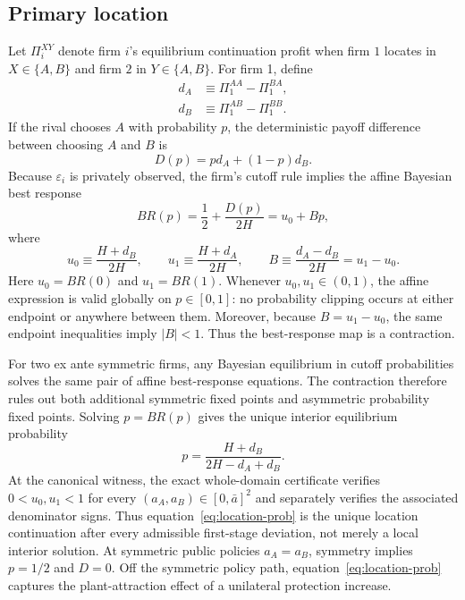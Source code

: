 \subsection{Primary location}

Let $\Pi^{XY}_i$ denote firm $i$'s equilibrium continuation profit when firm $1$ locates in $X\in\{A,B\}$ and firm $2$ in $Y\in\{A,B\}$. For firm 1, define
\begin{align}
d_A&\equiv \Pi^{AA}_1-\Pi^{BA}_1,\\
d_B&\equiv \Pi^{AB}_1-\Pi^{BB}_1.
\end{align}
If the rival chooses $A$ with probability $p$, the deterministic payoff difference between choosing $A$ and $B$ is
\begin{equation}
D(p)=p d_A+(1-p)d_B.
\end{equation}
Because $\varepsilon_i$ is privately observed, the firm's cutoff rule implies the affine Bayesian best response
\begin{equation}
BR(p)=\frac12+\frac{D(p)}{2H}
=u_0+Bp,
\label{eq:location-br}
\end{equation}
where
\begin{equation}
u_0\equiv\frac{H+d_B}{2H},
\qquad
u_1\equiv\frac{H+d_A}{2H},
\qquad
B\equiv\frac{d_A-d_B}{2H}=u_1-u_0.
\label{eq:location-endpoints}
\end{equation}
Here $u_0=BR(0)$ and $u_1=BR(1)$. Whenever $u_0,u_1\in(0,1)$, the affine expression is valid globally on $p\in[0,1]$: no probability clipping occurs at either endpoint or anywhere between them. Moreover, because $B=u_1-u_0$, the same endpoint inequalities imply $|B|<1$. Thus the best-response map is a contraction.

For two ex ante symmetric firms, any Bayesian equilibrium in cutoff probabilities solves the same pair of affine best-response equations. The contraction therefore rules out both additional symmetric fixed points and asymmetric probability fixed points. Solving $p=BR(p)$ gives the unique interior equilibrium probability
\begin{equation}
p=\frac{H+d_B}{2H-d_A+d_B}.
\label{eq:location-prob}
\end{equation}
At the canonical witness, the exact whole-domain certificate verifies $0<u_0,u_1<1$ for every $(a_A,a_B)\in[0,\bar a]^2$ and separately verifies the associated denominator signs. Thus equation~\eqref{eq:location-prob} is the unique location continuation after every admissible first-stage deviation, not merely a local interior solution. At symmetric public policies $a_A=a_B$, symmetry implies $p=1/2$ and $D=0$. Off the symmetric policy path, equation~\eqref{eq:location-prob} captures the plant-attraction effect of a unilateral protection increase.
